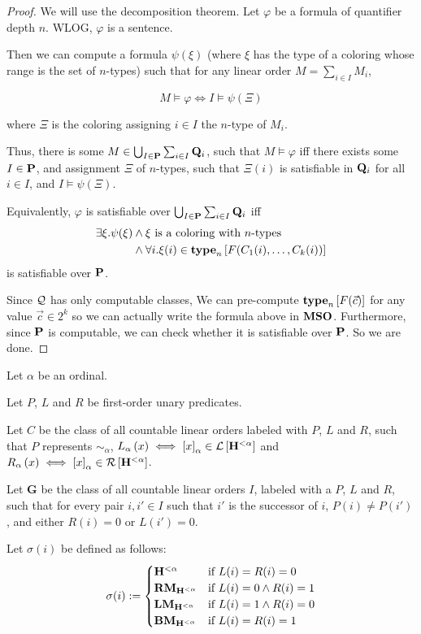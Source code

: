 \begin{proof}
  We will use the decomposition theorem.
  Let $\varphi$ be a formula of quantifier depth $n$. WLOG, $\varphi$ is a sentence.

  Then we can compute a formula $\psi(\xi)$ (where
  $\xi$ has the type of a coloring whose range is
  the set of $n$-types) such that
  for any linear order $M = \sum_{i \in I} M_i$,

  \[
    M \models \varphi \iff I \models \psi(\Xi)
  \]

  where $\Xi$ is the coloring assigning $i \in I$ the $n$-type of $M_i$.

  Thus, there is some $M \in \bigcup_{I \in \mathbf{P}} \sum_{i \in I} \mathbf{Q}_i$,
  such that $M \models \varphi$
  iff there exists some $I \in \mathbf{P}$, and assignment $\Xi$ of $n$-types,
  such that $\Xi(i)$ is satisfiable in $\mathbf{Q}_i$ for all $i \in I$, and $I \models \psi(\Xi)$.

  Equivalently, $\varphi$ is satisfiable over $\bigcup_{I \in \mathbf{P}} \sum_{i \in I} \mathbf{Q}_i$
  iff
  \begin{align*}
    \exists \xi. \psi(\xi)
     & \wedge \xi \text{ is a coloring with }n\text{-types}             \\
     & \wedge \forall i. \xi(i) \in \mathbf{type}_{n} \left[ {F(C_1(i), \ldots, C_k(i))} \right]
  \end{align*}
  is satisfiable over $\mathbf{P}$.

  Since $\mathcal{Q}$ has only computable classes, We can pre-compute $\mathbf{type}_{n} \left[ {F(\vec{c})} \right]$
  for any value $\vec{c} \in 2^k$ so we can actually write the formula above in
  $\mathbf{MSO}$. Furthermore, since $\mathbf{P}$ is computable, we can check whether it is satisfiable
  over $\mathbf{P}$. So we are done.
\end{proof}

\begin{lemma}{\label{single-ordinal-decomposition}}
  Let $\alpha$ be an ordinal.

  Let $P$, $L$ and $R$ be
  first-order unary predicates.

  Let $C$ be the class of
  all countable linear orders labeled with $P$, $L$ and $R$,
  such that $P$ represents $\sim_{\alpha}$,
  $L_{\alpha} \left( {x} \right) \iff \left[ {x} \right]_{\alpha} \in \mathcal{L} \left[ {{\mathbf{H}_{}^{< \alpha}}} \right]$ and
  $R_{\alpha} \left( {x} \right) \iff \left[ {x} \right]_{\alpha} \in \mathcal{R} \left[ {{\mathbf{H}_{}^{< \alpha}}} \right]$.

  Let $\mathbf{G}$ be the class of all countable linear orders $I$,
  labeled with a $P$, $L$ and $R$,
  such that for every pair $i, i' \in I$ such that $i'$ is the successor of $i$,
  $P(i) \ne P(i')$,
  and either $R(i) = 0$ or $L(i') = 0$.

  Let $\sigma(i)$ be defined as follows:
  \[
    \sigma(i) := \begin{cases}
      \mathbf{H}_{}^{< \alpha} & \text{if } L(i) = R(i) = 0 \\
      \mathbf{RM}_{\mathbf{H}_{}^{< \alpha}} & \text{if } L(i) = 0 \wedge R(i) = 1 \\
      \mathbf{LM}_{\mathbf{H}_{}^{< \alpha}} & \text{if } L(i) = 1 \wedge R(i) = 0 \\
      \mathbf{BM}_{\mathbf{H}_{}^{< \alpha}} & \text{if } L(i) = R(i) = 1
    \end{cases}
  \]
\end{lemma}

